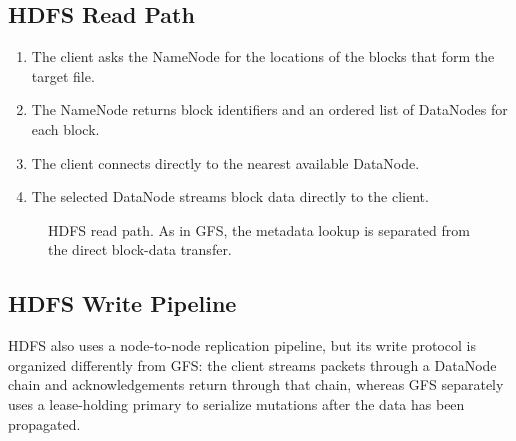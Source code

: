 \documentclass[11pt,a4paper,oneside]{book}
\begin{document}
\subsection{HDFS Read Path}

\begin{enumerate}
    \item The client asks the NameNode for the locations of the blocks that form the target file.
    \item The NameNode returns block identifiers and an ordered list of DataNodes for each block.
    \item The client connects directly to the nearest available DataNode.
    \item The selected DataNode streams block data directly to the client.
\end{enumerate}

\begin{figure}[htbp]
\centering
{}
\caption{HDFS read path. As in GFS, the metadata lookup is separated from the direct block-data transfer.}
\label{fig:hdfs-read}
\end{figure}

\subsection{HDFS Write Pipeline}

HDFS also uses a node-to-node replication pipeline, but its write protocol is organized differently from GFS: the client streams packets through a DataNode chain and acknowledgements return through that chain, whereas GFS separately uses a lease-holding primary to serialize mutations after the data has been propagated.
\end{document}
